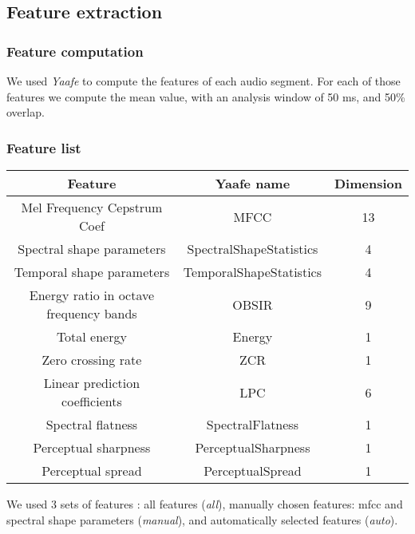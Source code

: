 \documentclass{beamer}
\begin{document}
    \subsection{Feature extraction}
    \begin{frame}
        \frametitle{Feature computation}
        We used \emph{Yaafe} to compute the features of each audio segment. For each of those features we compute the mean value, with an analysis window of 50 ms, and 50\% overlap.
    \end{frame}
    \begin{frame}
        \frametitle{Feature list}
        \footnotesize 
        \begin{center}
        \begin{tabular}{|c|c|c|}
\hline
Feature&Yaafe name&Dimension\\
\hline
Mel Frequency Cepstrum Coef&MFCC&13\\
\hline
Spectral shape parameters&SpectralShapeStatistics&4\\
\hline
Temporal shape parameters&TemporalShapeStatistics&4\\
\hline
Energy ratio in octave frequency bands&OBSIR&9\\
\hline
Total energy&Energy&1\\
\hline
Zero crossing rate&ZCR&1\\
\hline
Linear prediction coefficients&LPC&6\\
\hline
Spectral flatness&SpectralFlatness&1\\
\hline
Perceptual sharpness&PerceptualSharpness&1\\
\hline
Perceptual spread&PerceptualSpread&1\\
\hline
\end{tabular}
\end{center}
        \normalsize
        We used 3 sets of features : all features (\emph{all}), manually chosen features: mfcc and spectral shape parameters (\emph{manual}), and automatically selected features (\emph{auto}).
    \end{frame}
\end{document}
